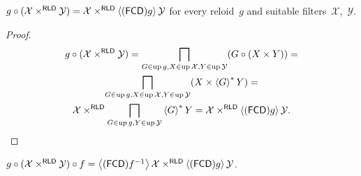 \begin{thm}\label{rld-prod-comp}
$g\circ(\mathcal{X}\times^{\mathsf{RLD}}\mathcal{Y})=
\mathcal{X}\times^{\mathsf{RLD}}\left\langle (\mathsf{FCD}) g\right\rangle\mathcal{Y}$
for every reloid~$g$ and suitable filters~$\mathcal{X}$,~$\mathcal{Y}$.
\end{thm}

\begin{proof}
\begin{multline*}
g\circ(\mathcal{X}\times^{\mathsf{RLD}}\mathcal{Y})=
\bigsqcap_{G\in\operatorname{up} g,X\in\operatorname{up}\mathcal{X},Y\in\operatorname{up}\mathcal{Y}}
(G\circ(X\times Y))=\\
\bigsqcap_{G\in\operatorname{up} g,X\in\operatorname{up}\mathcal{X},Y\in\operatorname{up}\mathcal{Y}}
(X\times\left\langle G\right\rangle ^{\ast}Y)=\\
\mathcal{X}\times^{\mathsf{RLD}}\bigsqcap_{G\in\operatorname{up} g,Y\in\operatorname{up}\mathcal{Y}}\left\langle G\right\rangle ^{\ast}Y=
\mathcal{X}\times^{\mathsf{RLD}}\left\langle (\mathsf{FCD}) g\right\rangle\mathcal{Y}.
\end{multline*}
\end{proof}

\begin{cor}
$g\circ(\mathcal{X}\times^{\mathsf{RLD}}\mathcal{Y})\circ f=
\left\langle (\mathsf{FCD}) f^{-1}\right\rangle\mathcal{X}\times^{\mathsf{RLD}}\left\langle (\mathsf{FCD}) g\right\rangle\mathcal{Y}$.
\end{cor}

